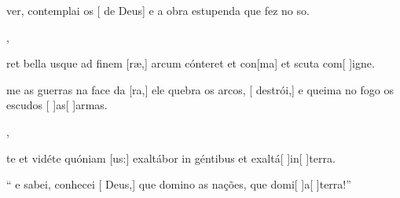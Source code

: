 {    {\item {} ver, contemplai os [ de Deus] e a obra estupenda que fez no so.~\Antiphona},
  {\item {}ret bella usque ad finem [ræ,] arcum cónteret et con[ma] et scuta com[ ]{i}gne.
      ~\Antiphona}%
    {\item {}me as guerras na face da [ra,] ele quebra os arcos, [ destrói,] e queima no fogo os escudos [ ]{as}[ ]{ar}mas.~\Antiphona},
  {\item {}te et vidéte quóniam [us:] exaltábor in géntibus et exaltá[ ]{in}[ ]{ter}ra.~\Antiphona}%
    {\item {}“ e sabei, conhecei [ Deus,] que domino as nações, que domi[ ]{a}[ ]{ter}ra!”~\Antiphona}
}